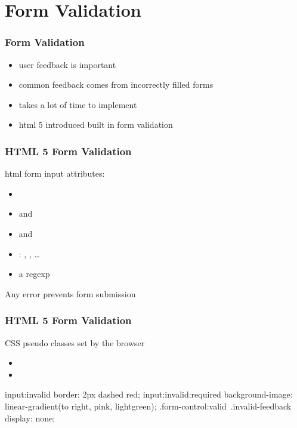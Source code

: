 \section{Form Validation}
\begin{frame}[fragile] \frametitle{Form Validation}
\begin{itemize}
  \item user feedback is important
  \item common feedback comes from incorrectly filled forms
  \item takes a lot of time to implement
  \item html 5 introduced built in form validation
\end{itemize}
\end{frame}

\begin{frame}[fragile] \frametitle{HTML 5 Form Validation}
html form input attributes:
\begin{itemize}
  \item {}
  \item {} and 
  \item {} and 
  \item {}: , , \ldots
  \item {} a regexp
\end{itemize}
\vspace{3mm}
Any error prevents form submission
\end{frame}

\begin{frame}[fragile] \frametitle{HTML 5 Form Validation}
CSS pseudo classes set by the browser
\begin{itemize}
  \item {}
  \item {}
\end{itemize}
\vspace{3mm}
\begin{CodeBox}{}
input:invalid {
  border: 2px dashed red;
}
input:invalid:required {
  background-image: linear-gradient(to right, pink, lightgreen);
}
.form-control:valid~.invalid-feedback {display: none;}
\end{CodeBox}
\end{frame}

